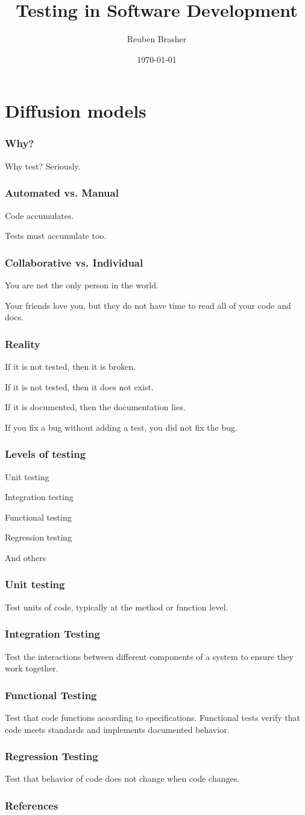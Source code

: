 \documentclass{beamer}
\title{Testing in Software Development}
\author{Reuben Brasher}
\date{\today}
\begin{document}
\frame{\titlepage}

\section[Outline]{}
\frame{\tableofcontents}

\section{Diffusion models}

\frame
{
   \frametitle{Why?}

    Why test? Seriously.
}

\frame
{
   \frametitle{Automated vs. Manual}

    Code accumulates.

    Tests must accumulate too.
}

\frame
{
   \frametitle{Collaborative vs. Individual}

    You are not the only person in the world.

    Your friends love you, but they do not have time to read all of your code and docs.
}

\frame
{
   \frametitle{Reality}

    If it is not tested, then it is broken.

    If it is not tested, then it does not exist.

    If it is documented, then the documentation lies.

    If you fix a bug without adding a test, you did not fix the bug.
}


\frame
{
   \frametitle{Levels of testing}

    Unit testing

    Integration testing

    Functional testing

    Regression testing

    And others
}

\frame
{
   \frametitle{Unit testing}

    Test units of code, typically at the method or function level.
}


\frame
{
   \frametitle{Integration Testing}

    Test the interactions between different components of a system to ensure they work together.
}

\frame
{
   \frametitle{Functional Testing}

    Test that code functions according to specifications. Functional tests verify that code meets standards and
    implements documented behavior.
}

\frame
{
   \frametitle{Regression Testing}

    Test that behavior of code does not change when code changes.
}



\begin{frame}[t,allowframebreaks]
\frametitle{References}
\printbibliography
\end{frame}
\end{document}
